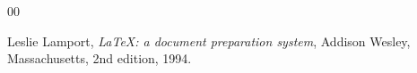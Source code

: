 \documentclass[preprint,12pt]{elsarticle}
\begin{document}


\begin{thebibliography}{00}


  Leslie Lamport,
  \textit{\LaTeX: a document preparation system},
  Addison Wesley, Massachusetts,
  2nd edition,
  1994.

\end{thebibliography}
\end{document}
